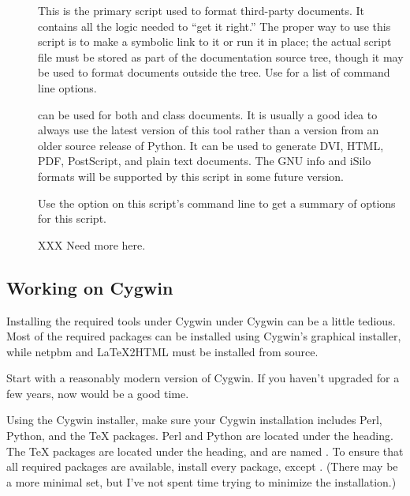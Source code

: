 \documentclass{howto}
\begin{document}
    \begin{description}
      \item[]
        This is the primary script used to format third-party
        documents.  It contains all the logic needed to ``get it
        right.''  The proper way to use this script is to make a
        symbolic link to it or run it in place; the actual script file
        must be stored as part of the documentation source tree,
        though it may be used to format documents outside the tree.
        Use   for a list of
        command line options.

         can be used for both  and
         class documents.  It is usually a good idea to
        always use the latest version of this tool rather than a
        version from an older source release of Python.  It can be
        used to generate DVI, HTML, PDF, PostScript, and plain text
        documents.  The GNU info and iSilo formats will be supported
        by this script in some future version.

        Use the  option on this script's command
        line to get a summary of options for this script.

        XXX  Need more here.
    \end{description}


  \subsection{Working on Cygwin \label{cygwin}}

    Installing the required tools under Cygwin under Cygwin can be a
    little tedious.  Most of the required packages can be installed
    using Cygwin's graphical installer, while netpbm and \LaTeX2HTML
    must be installed from source. 

    Start with a reasonably modern version of Cygwin.  If you haven't
    upgraded for a few years, now would be a good time.

    Using the Cygwin installer, make sure your Cygwin installation
    includes Perl, Python, and the \TeX{} packages.  Perl and Python
    are located under the  heading.  The
    \TeX{} packages are located under the 
    heading, and are named .  To ensure that all
    required packages are available, install every 
    package, except .  (There may be a more minimal
    set, but I've not spent time trying to minimize the installation.) 
\end{document}
